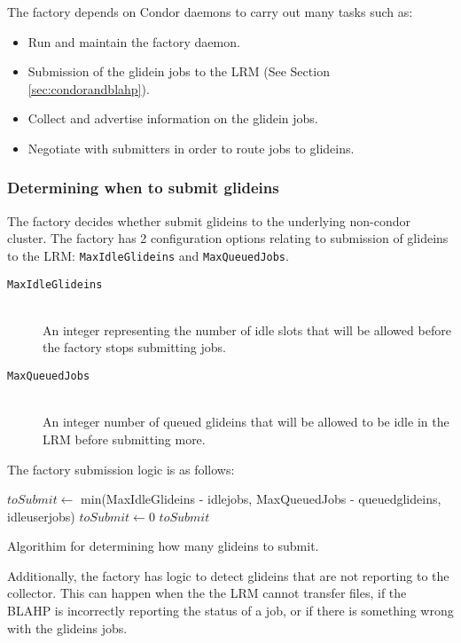 \documentclass[11pt]{article}
\begin{document}
The factory depends on Condor daemons to carry out many tasks such as:
\begin{itemize}
\item Run and maintain the factory daemon.
\item Submission of the glidein jobs to the LRM (See Section \ref{sec:condorandblahp}).
\item Collect and advertise information on the glidein jobs.
\item Negotiate with submitters in order to route jobs to glideins.
\end{itemize}


\subsubsection{Determining when to submit glideins}
The factory decides whether submit glideins to the underlying non-condor cluster.  The factory has 2 configuration options relating to submission of glideins to the LRM: \texttt{MaxIdleGlideins} and \texttt{MaxQueuedJobs}.

\begin{description}
\item[ \texttt{MaxIdleGlideins}] \hfill \\
An integer representing the number of idle slots that will be allowed before the factory stops submitting jobs. 

\item[ \texttt{MaxQueuedJobs}] \hfill \\
An integer number of queued glideins that will be allowed to be idle in the LRM before submitting more. 

\end{description}

The factory submission logic is as follows:

\begin{algorithm}
\begin{algorithmic}
	\STATE $toSubmit \gets$ min(MaxIdleGlideins - idlejobs, MaxQueuedJobs - queuedglideins, idleuserjobs)
\ELSE
	\STATE $toSubmit \gets 0$
\ENDIF
\RETURN $toSubmit$

\end{algorithmic}
\caption{Algorithim for determining how many glideins to submit.}
\end{algorithm}

Additionally, the factory has logic to detect glideins that are not reporting to the collector.  This can happen when the the LRM cannot transfer files, if the BLAHP is incorrectly reporting the status of a job, or if there is something wrong with the glideins jobs.
\end{document}
